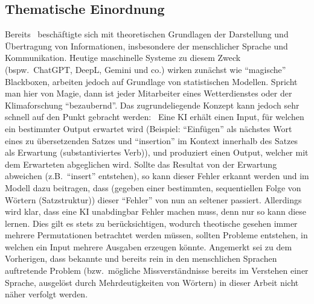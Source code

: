 \subsection{Thematische Einordnung}\label{einleitung:motivation}
Bereits~\cite{bellSystemTechnicalJournal:claudeShannon1948:mathematicalTheoryOfCommunication} beschäftigte sich mit theoretischen Grundlagen der Darstellung und Übertragung von Informationen, insbesondere der menschlicher Sprache und Kommunikation. Heutige maschinelle Systeme zu diesem Zweck (bspw.\ ChatGPT, DeepL, Gemini und co.) wirken zunächst wie \enquote{magische} Blackboxen, arbeiten jedoch auf Grundlage von statistischen Modellen. Spricht man hier von Magie, dann ist jeder Mitarbeiter eines Wetterdienstes oder der Klimaforschung \enquote{bezaubernd}. Das zugrundeliegende Konzept kann jedoch sehr schnell auf den Punkt gebracht werden:\ 
Eine KI erhält einen Input, für welchen ein bestimmter Output erwartet wird (Beispiel: \enquote{Einfügen} als nächstes Wort eines zu übersetzenden Satzes und \enquote{insertion} im Kontext innerhalb des Satzes als Erwartung (substantiviertes Verb)), und produziert einen Output, welcher mit dem Erwarteten abgeglichen wird. Sollte das Resultat von der Erwartung abweichen (z.B.\ \enquote{insert} entstehen), so kann dieser Fehler erkannt werden und im Modell dazu beitragen, dass (gegeben einer bestimmten, sequentiellen Folge von Wörtern (Satzstruktur)) dieser \enquote{Fehler} von nun an seltener passiert. Allerdings wird klar, dass eine KI unabdingbar Fehler machen muss, denn nur so kann diese lernen. Dies gilt es stets zu berücksichtigen, wodurch theotische gesehen immer mehrere Permutationen betrachtet werden müssen, sollten Probleme entstehen, in welchen ein Input mehrere Ausgaben erzeugen könnte. Angemerkt sei zu dem Vorherigen, dass bekannte und bereits rein in den menschlichen Sprachen auftretende Problem (bzw.\ mögliche Missverständnisse bereits im Verstehen einer Sprache, ausgelöst durch Mehrdeutigkeiten von Wörtern) in dieser Arbeit nicht näher verfolgt werden.

